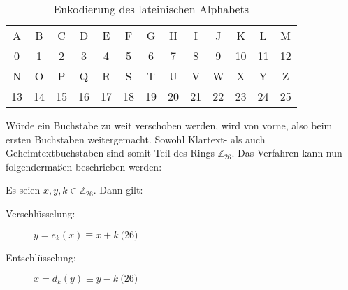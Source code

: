 \begin{table}[h]
  \centering
  \caption{Enkodierung des lateinischen Alphabets}
  \begin{tabular}{|c|c|c|c|c|c|c|c|c|c|c|c|c|}
    \hline
    A  & B  & C  & D  & E  & F  & G  & H  & I  & J  & K  & L  & M  \\
    0  & 1  & 2  & 3  & 4  & 5  & 6  & 7  & 8  & 9  & 10 & 11 & 12 \\
    \hline
    N  & O  & P  & Q  & R  & S  & T  & U  & V  & W  & X  & Y  & Z  \\
    13 & 14 & 15 & 16 & 17 & 18 & 19 & 20 & 21 & 22 & 23 & 24 & 25 \\
    \hline
  \end{tabular}
  \label{tab:encode-alph}
\end{table}

\noindent
Würde ein Buchstabe zu weit verschoben werden, wird von vorne,
also beim ersten Buchstaben weitergemacht.
Sowohl Klartext- als auch Geheimtextbuchstaben sind somit Teil des Rings $\mathbb{Z}_{26}$.
Das Verfahren kann nun folgendermaßen beschrieben werden:

\begin{definition}
  Es seien $x,y,k \in \mathbb{Z}_{26}$. Dann gilt:
  \begin{description}
    \item[Verschlüsselung:] $y = e_k(x) \equiv x + k \pod{26}$
    \item[Entschlüsselung:] $x = d_k(y) \equiv y - k \pod{26}$
  \end{description}
\end{definition}

